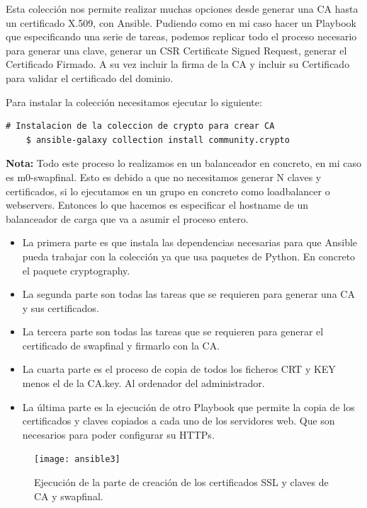 Esta colección nos permite realizar muchas opciones desde generar una CA hasta un certificado X.509, con Ansible. Pudiendo como en mi caso hacer un Playbook que especificando una serie de tareas, podemos replicar todo el proceso necesario para generar una clave, generar un CSR Certificate Signed Request, generar el Certificado Firmado. A su vez incluir la firma de la CA y incluir su Certificado para validar el certificado del dominio.
\vspace{5mm}

Para instalar la colección necesitamos ejecutar lo siguiente:

\begin{lstlisting}[style=mybash]
	# Instalacion de la coleccion de crypto para crear CA
	$ ansible-galaxy collection install community.crypto
\end{lstlisting}

\textbf{Nota:} Todo este proceso lo realizamos en un balanceador en concreto, en mi caso es m0-swapfinal. Esto es debido a que no necesitamos generar N claves y certificados, si lo ejecutamos en un grupo en concreto como loadbalancer o webservers. Entonces lo que hacemos es especificar el hostname de un balanceador de carga que va a asumir el proceso entero.

\begin{itemize}
	\item La primera parte es que instala las dependencias necesarias para que Ansible pueda trabajar con la colección ya que usa paquetes de Python. En concreto el paquete cryptography.
	\item La segunda parte son todas las tareas que se requieren para generar una CA y sus certificados.
	\item La tercera parte son todas las tareas que se requieren para generar el certificado de swapfinal y firmarlo con la CA.
	\item La cuarta parte es el proceso de copia de todos los ficheros CRT y KEY menos el de la CA.key. Al ordenador del administrador.
	\item La última parte es la ejecución de otro Playbook que permite la copia de los certificados y claves copiados a cada uno de los servidores web. Que son necesarios para poder configurar su HTTPs.
\end{itemize}

\begin{figure}[H]
	\centering
	\texttt{[image: ansible3]}
	\caption{Ejecución de la parte de creación de los certificados SSL y claves de CA y swapfinal.}
\end{figure}

